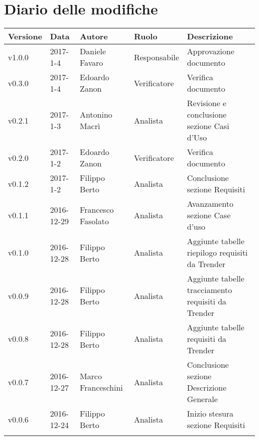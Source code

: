\section*{Diario delle modifiche}
	\begin{longtabu} to \textwidth {
	X[3,c,m] 
	X[4,c,m]
	X[4,c,m]
	X[5,c,m]
	X[10,c,m]}
	\toprule
	\textbf{Versione} & \textbf{Data}  & \textbf{Autore} & \textbf{Ruolo} & \textbf{Descrizione}\\
	\midrule
	\endhead

		v1.0.0 & 2017-1-4 & Daniele Favaro & Responsabile & Approvazione documento \\ 
		\addlinespace[0.4em]
		\midrule
		\addlinespace[0.4em]
		v0.3.0 & 2017-1-4 & Edoardo Zanon & Verificatore & Verifica documento \\ 
		\addlinespace[0.4em]
		\midrule
		\addlinespace[0.4em]
		v0.2.1 & 2017-1-3 & Antonino Macrì & Analista & Revisione e conclusione sezione Casi d'Uso \\ 
		\addlinespace[0.4em]
		\midrule
		\addlinespace[0.4em]
		v0.2.0 & 2017-1-2 & Edoardo Zanon & Verificatore & Verifica documento \\ 
		\addlinespace[0.4em]
		\midrule
		\addlinespace[0.4em]
		v0.1.2 & 2017-1-2 & Filippo Berto & Analista & Conclusione sezione Requisiti \\ 
		\addlinespace[0.4em]
		\midrule
		\addlinespace[0.4em]
		v0.1.1 & 2016-12-29 & Francesco Fasolato & Analista & Avanzamento sezione Case d'uso \\ 
		\addlinespace[0.4em]
		\midrule
		\addlinespace[0.4em]
		v0.1.0 & 2016-12-28 & Filippo Berto & Analista & Aggiunte tabelle riepilogo requisiti da Trender \\ 
		\addlinespace[0.4em]
		\midrule
		\addlinespace[0.4em]
		v0.0.9 & 2016-12-28 & Filippo Berto & Analista & Aggiunte tabelle tracciamento requisiti da Trender \\ 
		\addlinespace[0.4em]
		\midrule
		\addlinespace[0.4em]
		v0.0.8 & 2016-12-28 & Filippo Berto & Analista & Aggiunte tabelle requisiti da Trender \\ 
		\addlinespace[0.4em]
		\midrule
		\addlinespace[0.4em]
		v0.0.7 & 2016-12-27 & Marco Franceschini & Analista & Conclusione sezione Descrizione Generale \\ 
		\addlinespace[0.4em]
		\midrule
		\addlinespace[0.4em]
		v0.0.6 & 2016-12-24 & Filippo Berto & Analista & Inizio stesura sezione Requisiti \\ 
		\addlinespace[0.4em]
		\midrule
		\addlinespace[0.4em]

\end{longtabu}
